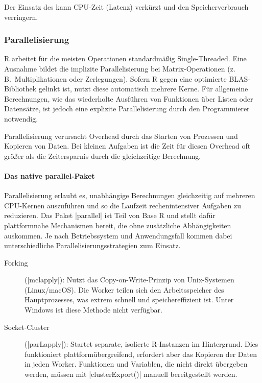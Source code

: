 \documentclass[10pt,twocolumn]{scrartcl}
\renewcommand{\lstinline}{\mycoloredinline}
\begin{document}
Der Einsatz des \lstinline{fastverse} kann CPU-Zeit (Latenz) verkürzt und den Speicherverbrauch verringern.


\subsubsection{Parallelisierung}

R arbeitet für die meisten Operationen standardmäßig Single-Threaded. Eine Ausnahme bildet die implizite Parallelisierung bei Matrix-Operationen (z.\,B.\ Multiplikationen oder Zerlegungen). Sofern R gegen eine optimierte BLAS-Bibliothek gelinkt ist, nutzt diese automatisch mehrere Kerne. Für allgemeine Berechnungen, wie das wiederholte Ausführen von Funktionen über Listen oder Datensätze, ist jedoch eine explizite Parallelisierung durch den Programmierer notwendig.

Parallelisierung verursacht Overhead durch das Starten von Prozessen und Kopieren von Daten. Bei kleinen Aufgaben ist die Zeit für diesen Overhead oft größer als die Zeitersparnis durch die gleichzeitige Berechnung.


\paragraph{Das native parallel-Paket}

Parallelisierung erlaubt es, unabhängige Berechnungen gleichzeitig auf mehreren CPU-Kernen auszuführen und so die Laufzeit rechenintensiver Aufgaben zu reduzieren. Das Paket \lstinline|parallel| ist Teil von Base R und stellt dafür plattformnahe Mechanismen bereit, die ohne zusätzliche Abhängigkeiten auskommen. Je nach Betriebssystem und Anwendungsfall kommen dabei unterschiedliche Parallelisierungsstrategien zum Einsatz.

\begin{description}
\item[Forking] (\lstinline|mclapply|): Nutzt das Copy-on-Write-Prinzip von Unix-Systemen (Linux/macOS). Die Worker teilen sich den Arbeitsspeicher des Hauptprozesses, was extrem schnell und speichereffizient ist. Unter Windows ist diese Methode nicht verfügbar.
\item[Socket-Cluster] (\lstinline|parLapply|): Startet separate, isolierte R-Instanzen im Hintergrund. Dies funktioniert plattformübergreifend, erfordert aber das Kopieren der Daten in jeden Worker. Funktionen und Variablen, die nicht direkt übergeben werden, müssen mit \lstinline|clusterExport()| manuell bereitgestellt werden.
\end{description}
\end{document}
